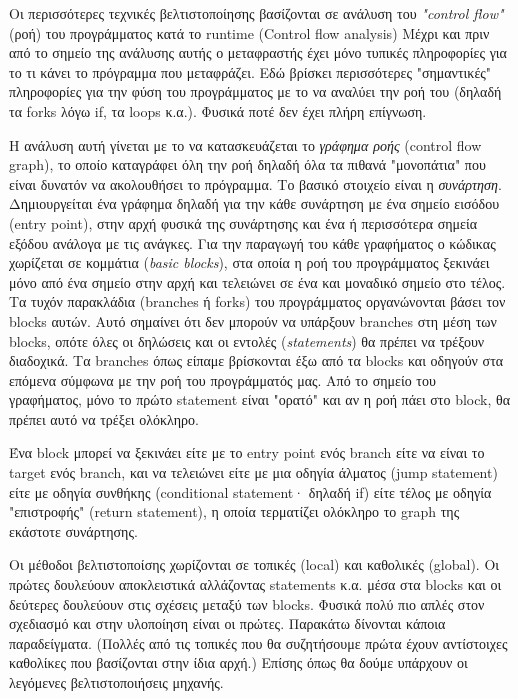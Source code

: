 Οι περισσότερες τεχνικές βελτιστοποίησης βασίζονται σε ανάλυση του
\textit{"control flow"} (ροή) του προγράμματος κατά το runtime (Control flow
analysis) Μέχρι και πριν από το σημείο της ανάλυσης αυτής ο μεταφραστής έχει
μόνο τυπικές πληροφορίες για το τι κάνει το πρόγραμμα που μεταφράζει. Εδώ
βρίσκει περισσότερες "σημαντικές" πληροφορίες για την φύση του προγράμματος με
το να αναλύει την ροή του (δηλαδή τα forks λόγω if, τα loops κ.α.). Φυσικά ποτέ
δεν έχει πλήρη επίγνωση.

Η ανάλυση αυτή γίνεται με το να κατασκευάζεται το \textit{γράφημα ροής} (control
flow graph), το οποίο καταγράφει όλη την ροή δηλαδή όλα τα πιθανά "μονοπάτια"
που είναι δυνατόν να ακολουθήσει το πρόγραμμα. Το βασικό στοιχείο είναι η
\textit{συνάρτηση}. Δημιουργείται ένα γράφημα δηλαδή για την κάθε συνάρτηση με
ένα σημείο εισόδου (entry point), στην αρχή φυσικά της συνάρτησης και ένα ή
περισσότερα σημεία εξόδου ανάλογα με τις ανάγκες. Για την παραγωγή του κάθε
γραφήματος ο κώδικας χωρίζεται σε κομμάτια (\textit{basic blocks}), στα οποία η
ροή του προγράμματος ξεκινάει μόνο από ένα σημείο στην αρχή και τελειώνει σε ένα
και μοναδικό σημείο στο τέλος. Τα τυχόν παρακλάδια (branches ή forks) του
προγράμματος οργανώνονται βάσει τον blocks αυτών. Αυτό σημαίνει ότι δεν μπορούν
να υπάρξουν branches στη μέση των blocks, οπότε όλες οι δηλώσεις και οι εντολές
(\textit{statements}) θα πρέπει να τρέξουν διαδοχικά. Τα branches όπως είπαμε
βρίσκονται έξω από τα blocks και οδηγούν στα επόμενα σύμφωνα με την ροή του
προγράμματός μας. Από το σημείο του γραφήματος, μόνο το πρώτο statement είναι
"ορατό" και αν η ροή πάει στο block, θα πρέπει αυτό να τρέξει ολόκληρο.

Ένα block μπορεί να ξεκινάει είτε με το entry point ενός branch είτε να είναι το
target ενός branch, και να τελειώνει είτε με μια οδηγία άλματος (jump statement)
είτε με οδηγία συνθήκης (conditional statement· δηλαδή if) είτε τέλος με οδηγία
"επιστροφής" (return statement), η οποία τερματίζει ολόκληρο το graph της
εκάστοτε συνάρτησης.

Οι μέθοδοι βελτιστοποίσης χωρίζονται σε τοπικές (local) και καθολικές (global).
Οι πρώτες δουλεύουν αποκλειστικά αλλάζοντας statements κ.α. μέσα στα blocks και
οι δεύτερες δουλεύουν στις σχέσεις μεταξύ των blocks. Φυσικά πολύ πιο απλές στον
σχεδιασμό και στην υλοποίηση είναι οι πρώτες. Παρακάτω δίνονται κάποια
παραδείγματα. (Πολλές από τις τοπικές που θα συζητήσουμε πρώτα έχουν αντίστοιχες
καθολίκες που βασίζονται στην ίδια αρχή.) Επίσης όπως θα δούμε  υπάρχουν οι
λεγόμενες βελτιστοποιήσεις μηχανής.


